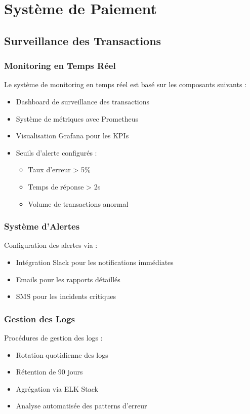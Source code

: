 \documentclass[14pt,a4paper]{report}
\begin{document}
\tableofcontents
\newpage

\chapter{Système de Paiement}

\section{Surveillance des Transactions}
\subsection{Monitoring en Temps Réel}
Le système de monitoring en temps réel est basé sur les composants suivants :
\begin{itemize}
    \item Dashboard de surveillance des transactions
    \item Système de métriques avec Prometheus
    \item Visualisation Grafana pour les KPIs
    \item Seuils d'alerte configurés :
        \begin{itemize}
            \item Taux d'erreur > 5\%
            \item Temps de réponse > 2s
            \item Volume de transactions anormal
        \end{itemize}
\end{itemize}

\subsection{Système d'Alertes}
Configuration des alertes via :
\begin{itemize}
    \item Intégration Slack pour les notifications immédiates
    \item Emails pour les rapports détaillés
    \item SMS pour les incidents critiques
\end{itemize}

\subsection{Gestion des Logs}
Procédures de gestion des logs :
\begin{itemize}
    \item Rotation quotidienne des logs
    \item Rétention de 90 jours
    \item Agrégation via ELK Stack
    \item Analyse automatisée des patterns d'erreur
\end{itemize}
\end{document}
